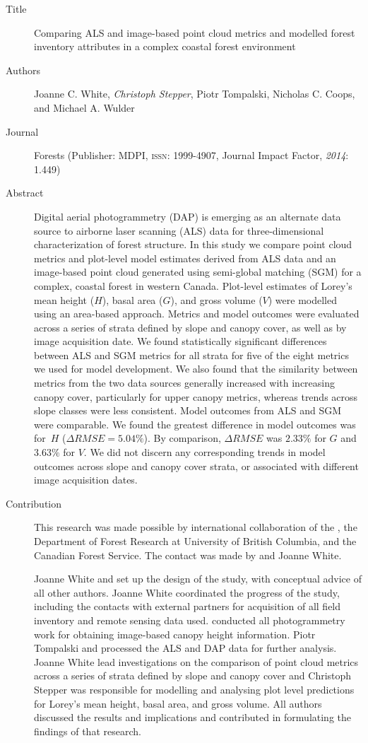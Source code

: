\begin{description}
	\item[Title] Comparing ALS and image-based point cloud metrics and modelled forest inventory attributes
		in a complex coastal forest environment
	\item[Authors] Joanne C. White, \emph{Christoph Stepper}, Piotr Tompalski, Nicholas C. Coops, and Michael A. Wulder
	\item[Journal] Forests (Publisher: MDPI, \textsc{issn}: 1999-4907, Journal Impact Factor, \emph{2014}: 1.449)
	\item[Abstract] Digital aerial photogrammetry (DAP) is emerging as an alternate data source to
		airborne laser scanning (ALS) data for three-dimensional characterization of forest
		structure. In this study we compare point cloud metrics and plot-level model estimates
		derived from ALS data and an image-based point cloud generated using semi-global
		matching (SGM) for a complex, coastal forest in western Canada. Plot-level estimates of
		Lorey’s mean height ($H$), basal area ($G$), and gross volume ($V$) were modelled using an
		area-based approach. Metrics and model outcomes were evaluated across a series of strata
		defined by slope and canopy cover, as well as by image acquisition date. We found
		statistically significant differences between ALS and SGM metrics for all strata for five of
		the eight metrics we used for model development. We also found that the similarity
		between metrics from the two data sources generally increased with increasing canopy
		cover, particularly for upper canopy metrics, whereas trends across slope classes were less
		consistent. Model outcomes from ALS and SGM were comparable. We found the greatest 
		difference in model outcomes was for~$H$ ($\Delta RMSE = 5.04\%$). By comparison, $\Delta RMSE$ was 
		$2.33\%$ for $G$ and $3.63\%$ for $V$. We did not discern any corresponding trends in model
		outcomes across slope and canopy cover strata, or associated with different image
		acquisition dates.
	\item[Contribution] This research was made possible by international collaboration of the \myInstitute,
		the Department of Forest Research at University of British Columbia, and the Canadian Forest Service. 
		The contact was made by \myName and Joanne White. 
	
		Joanne White and \myName set up the design of the study, with conceptual advice of all other authors. 
		Joanne White coordinated the progress of the study, including the contacts with external partners for acquisition 
		of all field inventory and remote sensing data used. \myName conducted all photogrammetry work for obtaining image-based
		canopy height information. Piotr Tompalski and \myName processed the \ac{ALS} and \ac{DAP} data for further analysis.
		Joanne White lead investigations on the comparison of point cloud metrics across a series of strata defined by slope and canopy cover
		and Christoph Stepper was responsible for modelling and analysing plot level predictions for Lorey’s mean height,
		basal area, and gross volume. 
		All authors discussed the results and implications and contributed in formulating the findings of that research.
	

\end{description}

